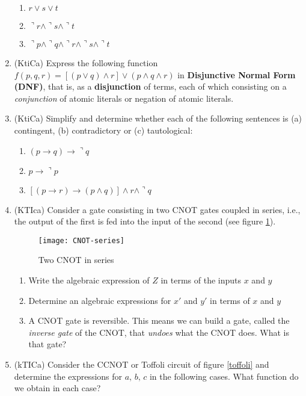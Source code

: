 \documentclass{article}
\begin{document}
\begin{enumerate}
\begin{enumerate}
\item $r \vee s \vee t$
\item $\urcorner r \wedge \urcorner s \wedge \urcorner t$
\item $\urcorner p \wedge \urcorner q \wedge \urcorner r \wedge \urcorner s \wedge \urcorner t$
\end{enumerate}
\item (KtiCa) Express the following function $f(p,q,r)=\left[ (p\vee q)\wedge r\right]\vee (p\wedge q \wedge r)$ in \textbf{Disjunctive Normal Form (DNF)}, 
	that is, as a \textbf{disjunction} of terms, each of which consisting on a {\sl conjunction} of atomic literals or negation of atomic literals.
\item (KtiCa) Simplify and determine whether each of the following sentences is (a) contingent, (b) contradictory or (c) tautological:
	\begin{enumerate}
		\item $(p\rightarrow q)\rightarrow \urcorner q$
		\item $p\rightarrow \urcorner p$
		\item $\left[\left(p\rightarrow r\right)\rightarrow (p\wedge q)\right]\wedge r\wedge \urcorner q$
	\end{enumerate}
\item (KTIca) Consider a gate consisting in two CNOT gates coupled in series, i.e., the output of the first is fed into the input of the second (see figure \ref{CNOTseries}).
	\begin{figure}
	\centering
	\texttt{[image: CNOT-series]}
	\caption{Two CNOT in series}
	\label{CNOTseries}
	\end{figure}
	\begin{enumerate}
	\item Write the algebraic expression of $Z$ in terms of the inputs $x$ and $y$
	\item Determine an algebraic expressions for $x'$ and $y'$ in terms of $x$ and $y$
	\item A CNOT gate is reversible. This means we can build a gate, called the \textit{inverse gate} of the CNOT, that \textit{undoes} what the CNOT does. What is that gate?
	\end{enumerate}
\item\label{qtof} (kTICa) Consider the CCNOT or Toffoli circuit of figure \ref{toffoli} and determine the expressions for $a,\,b,\,c$ in the following cases. What function do we obtain in each case?
	\begin{enumerate}

\end{enumerate}
\end{enumerate}
\end{document}
